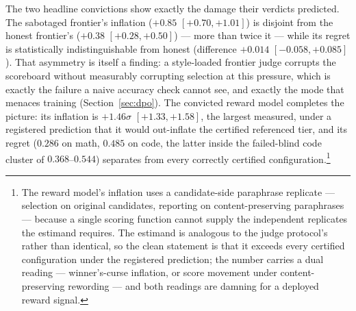 \documentclass[11pt]{article}
\begin{document}
The two headline convictions show exactly the damage their verdicts predicted.
The sabotaged frontier's inflation ($+0.85$ $[+0.70, +1.01]$) is disjoint from the honest frontier's ($+0.38$ $[+0.28, +0.50]$) --- more than twice it --- while its regret is statistically indistinguishable from honest (difference $+0.014$ $[-0.058, +0.085]$).
That asymmetry is itself a finding: a style-loaded frontier judge corrupts the scoreboard without measurably corrupting selection at this pressure, which is exactly the failure a naive accuracy check cannot see, and exactly the mode that menaces training (Section~\ref{sec:dpo}).
The convicted reward model completes the picture: its inflation is $+1.46\sigma$ $[+1.33, +1.58]$, the largest measured, under a registered prediction that it would out-inflate the certified referenced tier, and its regret ($0.286$ on math, $0.485$ on code, the latter inside the failed-blind code cluster of $0.368$--$0.544$) separates from every correctly certified configuration.\footnote{The reward model's inflation uses a candidate-side paraphrase replicate --- selection on original candidates, reporting on content-preserving paraphrases --- because a single scoring function cannot supply the independent replicates the estimand requires. The estimand is analogous to the judge protocol's rather than identical, so the clean statement is that it exceeds every certified configuration under the registered prediction; the number carries a dual reading --- winner's-curse inflation, or score movement under content-preserving rewording --- and both readings are damning for a deployed reward signal.}
\end{document}
